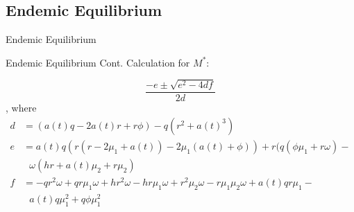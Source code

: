 \documentclass{beamer}
\begin{document}
\subsection{Endemic Equilibrium}
\begin{frame}{Endemic Equilibrium}
\end{frame}


\begin{frame}{Endemic Equilibrium Cont.}
Calculation for $M^{*}$:

$$\frac{-e \pm \sqrt{e^2 - 4df}}{2d}$$, where
\begin{align*}
    d &= (a(t)q-2a(t)r+r \phi ) - q(r^{2}+a(t)^{3})\\
    e &= a(t)q(r(r-2\mu_{1}+a(t))-2\mu_{1}(a(t)+\phi )) +  r(q(\phi \mu_{1} + r \omega ) - \\ & \ \ \  \omega(hr+a(t) \mu_{2} + r\mu_{2})\\
    f &= -qr^{2} \omega +qr\mu_{1} \omega + hr^{2} \omega - hr\mu_{1} \omega + r^2 \mu_{2} \omega - r \mu_{1} \mu_{2} \omega + a(t)qr \mu_{1} - \\ & \ \ \  a(t)q\mu_{1}^{2} +q\phi \mu_{1}^{2}
\end{align*}

\end{frame}
\end{document}
